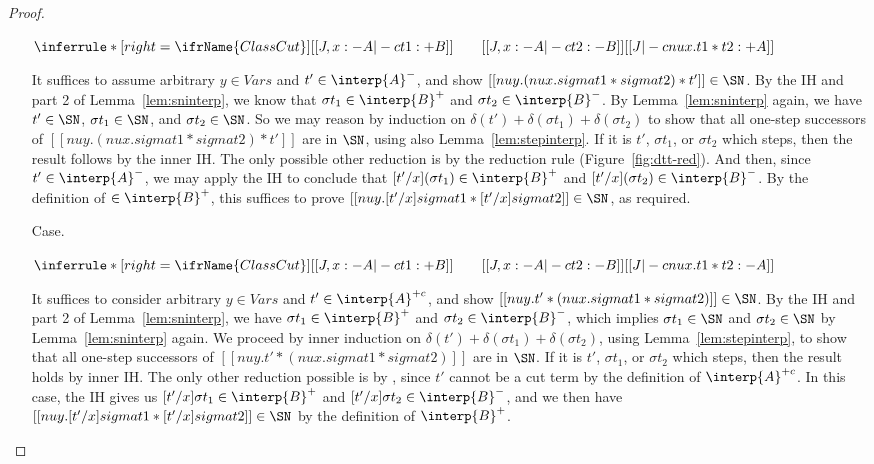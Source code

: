 \begin{proof}
\begin{itemize}
\vspace{-.2cm}
\begin{center}
\begin{math}
\inferrule* [right=\ifrName{ClassCut}] {[[ J , x : - A  |-c t1 : + B ]]  \qquad [[  J , x : - A  |-c t2 : - B ]]}{[[  J |-c nu x . t1 * t2 : + A ]]}
\end{math}
\end{center}
It suffices to assume arbitrary $y\in\textit{Vars}$ and
$t'\in\interp{A}^-$, and show $[[nu y . (nu x . sigma t1 * sigma t2) *
t']]\in\SN$.  By the IH and part 2 of Lemma~\ref{lem:sninterp}, we
know that $\sigma t_1\in\interp{B}^+$ and $\sigma t_2\in\interp{B}^-$.
By Lemma~\ref{lem:sninterp} again, we have $t'\in\SN$, $\sigma
t_1\in\SN$, and $\sigma t_2\in\SN$.  So we may reason by induction on
$\delta(t')+\delta(\sigma t_1)+\delta(\sigma t_2)$ to show that all
one-step successors of $[[nu y . (nu x . sigma t1 * sigma t2) * t']]$
are in $\SN$, using also Lemma~\ref{lem:stepinterp}.  If it is $t'$,
$\sigma t_1$, or $\sigma t_2$ which steps, then the result follows by
the inner IH.  The only possible other reduction is by the
 reduction rule (Figure~\ref{fig:dtt-red}).  And
then, since $t'\in\interp{A}^-$, we may apply the IH to conclude that
$[t'/x](\sigma t_1)\in\interp{B}^+$ and $[t'/x](\sigma t_2)\in\interp{B}^-$.
By the definition of $\in\interp{B}^+$, this suffices to prove
$[[nu y . [t'/x] sigma t1 * [t'/x]sigma t2]]\in\SN$, as required.

\item[Case.]\ 

\vspace{-.2cm}
\begin{center}
\begin{math}
\inferrule* [right=\ifrName{ClassCut}] {[[ J , x : - A  |-c t1 : + B ]]  \qquad [[  J , x : - A  |-c t2 : - B ]]}{[[  J |-c nu x . t1 * t2 : - A ]]}
\end{math}
\end{center}
It suffices to consider arbitrary $y\in\textit{Vars}$ and
$t'\in\interp{A}^{+c}$, and show $[[nu y. t' * (nu x . sigma t1 *
sigma t2)]]\in\SN$.  By the IH and part 2 of Lemma~\ref{lem:sninterp},
we have $\sigma t_1\in\interp{B}^+$ and $\sigma t_2\in\interp{B}^-$,
which implies $\sigma t_1\in\SN$ and $\sigma t_2\in\SN$ by
Lemma~\ref{lem:sninterp} again.  We proceed by inner induction on
$\delta(t')+\delta(\sigma t_1)+\delta(\sigma t_2)$, using
Lemma~\ref{lem:stepinterp}, to show that all one-step successors of
$[[nu y. t' * (nu x . sigma t1 * sigma t2)]]$ are in $\SN$.  If it is
$t'$, $\sigma t_1$, or $\sigma t_2$ which steps, then the result holds
by inner IH.  The only other reduction possible is by
, since $t'$ cannot be a cut term by the
definition of $\interp{A}^{+c}$.  In this case, the IH gives us
$[t'/x]\sigma t_1\in\interp{B}^+$ and $[t'/x]\sigma
t_2\in\interp{B}^-$, and we then have $[[nu y . [t'/x]sigma t1 *
[t'/x]sigma t2]]\in\SN$ by the definition of $\interp{B}^+$.
\end{itemize}

\end{proof}


